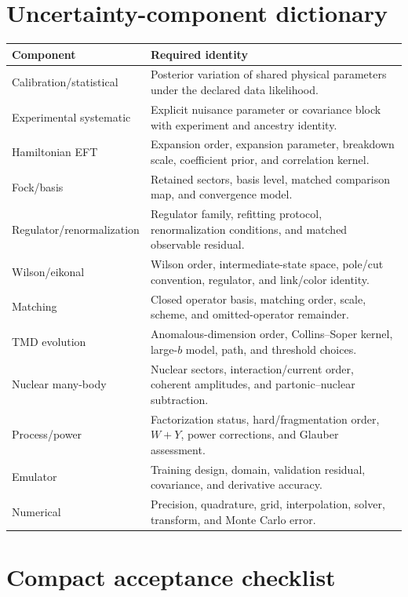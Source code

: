 \documentclass[11pt]{article}
\begin{document}
\section{Uncertainty-component dictionary}
\label{app:uncertainty-dictionary}

\begin{longtable}{L{0.28\textwidth}L{0.62\textwidth}}
\toprule
Component & Required identity\\
\midrule
\endhead
Calibration/statistical &
Posterior variation of shared physical parameters under the declared data
likelihood.\\
Experimental systematic &
Explicit nuisance parameter or covariance block with experiment and ancestry
identity.\\
Hamiltonian EFT &
Expansion order, expansion parameter, breakdown scale, coefficient prior, and
correlation kernel.\\
Fock/basis &
Retained sectors, basis level, matched comparison map, and convergence model.\\
Regulator/renormalization &
Regulator family, refitting protocol, renormalization conditions, and matched
observable residual.\\
Wilson/eikonal &
Wilson order, intermediate-state space, pole/cut convention, regulator, and
link/color identity.\\
Matching &
Closed operator basis, matching order, scale, scheme, and omitted-operator
remainder.\\
TMD evolution &
Anomalous-dimension order, Collins--Soper kernel, large-\(b\) model, path, and
threshold choices.\\
Nuclear many-body &
Nuclear sectors, interaction/current order, coherent amplitudes, and
partonic--nuclear subtraction.\\
Process/power &
Factorization status, hard/fragmentation order, \(W+Y\), power corrections,
and Glauber assessment.\\
Emulator &
Training design, domain, validation residual, covariance, and derivative
accuracy.\\
Numerical &
Precision, quadrature, grid, interpolation, solver, transform, and Monte Carlo
error.\\
\bottomrule
\end{longtable}

\section{Compact acceptance checklist}
\label{app:checklist}
\end{document}
